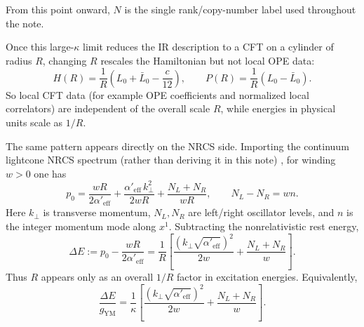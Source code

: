 \documentclass[11pt]{article}
\newcommand{\Aeff}{\alpha'_{\mathrm{eff}}}
\begin{document}
From this point onward, $N$ is the single rank/copy-number label used throughout the note.

Once this large-$\kappa$ limit reduces the IR description to a CFT on a cylinder
of radius $R$, changing $R$ rescales the Hamiltonian but not local OPE data:
\begin{equation}
H(R)=\frac{1}{R}\left(L_0+\bar L_0-\frac{c}{12}\right),
\qquad
P(R)=\frac{1}{R}\left(L_0-\bar L_0\right).
\end{equation}
So local CFT data (for example OPE coefficients and normalized local correlators) are independent of the overall scale $R$, while energies in physical units scale as $1/R$.

The same pattern appears directly on the NRCS side. Importing the continuum lightcone NRCS spectrum (rather than deriving it in this note) \cite{gomis2000nonrelativisticclosedstringtheory}, for winding $w>0$ one has
\begin{equation}\label{eq:nrcs-spectrum-cylinder}
p_0=
\frac{wR}{2\Aeff}
 +\frac{\Aeff\,k_\perp^2}{2wR}
 +\frac{N_L+N_R}{wR},
\qquad
N_L-N_R=wn.
\end{equation}
Here $k_\perp$ is transverse momentum, $N_L,N_R$ are left/right oscillator levels, and $n$ is the integer momentum mode along $x^1$.
Subtracting the nonrelativistic rest energy,
\begin{equation}
\Delta E:=p_0-\frac{wR}{2\Aeff}
=
\frac{1}{R}
\left[
\frac{(k_\perp\sqrt{\Aeff})^2}{2w}
 +\frac{N_L+N_R}{w}
\right].
\end{equation}
Thus $R$ appears only as an overall $1/R$ factor in excitation energies.
Equivalently,
\begin{equation}\label{eq:deltaE-over-gYM}
\frac{\Delta E}{g_{\mathrm{YM}}}
=
\frac{1}{\kappa}
\left[
\frac{(k_\perp\sqrt{\Aeff})^2}{2w}
 +\frac{N_L+N_R}{w}
\right].
\end{equation}
\end{document}

